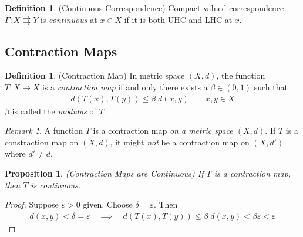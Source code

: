 \documentclass[12pt]{book}
\numberwithin{equation}{section} %
\theoremstyle{plain}
\newtheorem{prop}[thm]{Proposition}
\theoremstyle{definition}
\newtheorem{defn}[thm]{Definition}
\theoremstyle{remark}
\newtheorem*{rmk}{Remark}
\begin{document}
\begin{defn}{(Continuous Correspondence)}
Compact-valued correspondence $\Gamma:X\rightrightarrows Y$ is
\emph{continuous} at $x\in X$ if it is both UHC and LHC at $x$.
\end{defn}

\clearpage
\subsection{Contraction Maps}

\begin{defn}{(Contraction Map)}
In metric space $(X,d)$, the function $T: X\rightarrow X$ is a
\emph{contraction map} if and only there exists a $\beta \in (0,1)$ such
that
\begin{align*}
  d(T(x), T(y)) \leq \beta \; d(x,y)
  \qquad x,y\in X
\end{align*}
$\beta$ is called the \emph{modulus} of $T$.
\end{defn}
\begin{rmk}
A function $T$ is a contraction map \emph{on a metric space $(X,d)$}. If
$T$ is a constraction map on $(X,d)$, it might \emph{not}
be a contraction map on $(X,d')$ where $d'\neq d$.
\end{rmk}

\begin{prop}{\emph{(Contraction Maps are Continuous)}}
If $T$ is a contraction map, then $T$ is continuous.
\end{prop}
\begin{proof}
Suppose $\varepsilon>0$ given. Choose $\delta=\varepsilon$. Then
\begin{align*}
  d(x,y) < \delta=\varepsilon
  \quad\implies\quad
  d(T(x),T(y)) \leq \beta \; d(x,y)
  < \beta \varepsilon < \varepsilon
\end{align*}
\end{proof}
\end{document}
